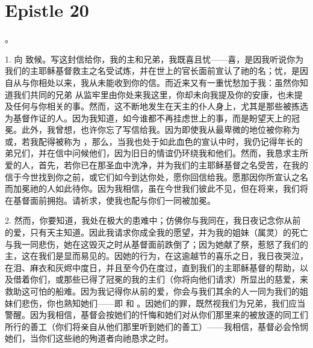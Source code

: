 

\section{Epistle 20}

。\par

\par

1.  向  致候。写这封信给你，我的主和兄弟，我既喜且忧——喜，是因我听说你为我们的主耶稣基督救主之名受试炼，并在世上的官长面前宣认了祂的名；忧，是因自从与你相处以来，我从未能收到你的信。而近来又有一重忧愁加于我：虽然你知道我们共同的兄弟  从监牢里由你处来我这里，你却未向我提及你的安康，也未提及任何与你相关的事。然而，这不断地发生在天主的仆人身上，尤其是那些被拣选为基督作证的人。因为我知道，如今谁都不再挂虑世上的事，而是盼望天上的冠冕。此外，我曾想，也许你忘了写信给我。因为即使我从最卑微的地位被你称为或，若我配得被称为 ，那么，当我也处于如此血色的宣认中时，我仍记得年长的弟兄们，并在信中问候他们，因为旧日的情谊仍环绕我和他们。然而，我恳求主所爱的人，首先，若你已在那圣血中洗净，并为我们的主耶稣基督之名受苦，在我的信于今世找到你之前，或它们如今到达你处，愿你回信给我。愿那因你所宣认之名而加冕祂的人如此待你。因为我相信，虽在今世我们彼此不见，但在将来，我们将在基督面前拥抱。请祈求，使我也配与你们一同被加冕。\par

2. 然而，你要知道，我处在极大的患难中；仿佛你与我同在，我日夜记念你从前的爱，只有天主知道。因此我请求你成全我的愿望，并为我的姐妹（属灵）的死亡与我一同悲伤，她在这毁灭之时从基督面前跌倒了；因为她献了祭，惹怒了我们的主，这在我们是显而易见的。因她的行为，在这逾越节的喜乐之日，我日夜哭泣，在泪、麻衣和灰烬中度日，并且至今仍在度过，直到我们的主耶稣基督的帮助，以及借着你们，或那些已得了冠冕的我的主们（你将向他们请求）所显出的慈爱，来救助这可怕的船难。因为我记得你从前的爱，你会与我们其余的人一同为我们的姐妹们悲伤，你也熟知她们——即  和 。因她们的罪，既然视我们为兄弟，我们应当警醒。因为我相信，基督会按她们的忏悔和她们对从你们那里来的被放逐的同工们所行的善工（你们将亲自从他们那里听到她们的善工）——我相信，基督必会怜悯她们，当你们这些祂的殉道者向祂恳求之时。\par

